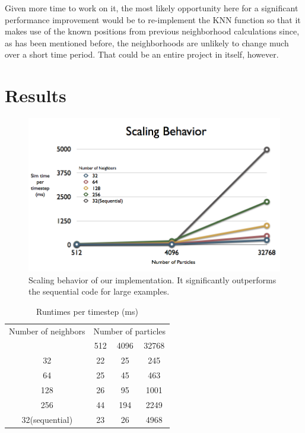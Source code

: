 \documentclass[cameraready]{acmsiggraph-awb}
\begin{document}
Given more time to work on it, the most likely opportunity here for a significant performance improvement would be to re-implement the KNN function so that it makes use of the known positions from previous neighborhood calculations since, as has been mentioned before, the neighborhoods are unlikely to change much over a short time period.
That could be an entire project in itself, however.

\section{Results}



\begin{figure}
\begin{centering}
\includegraphics[width = 5in]{Figures/charts_001.png}
\caption{Scaling behavior of our implementation.  It significantly outperforms the sequential code for large examples.}
\label{fig:scaling1}
\end{centering}
\end{figure}

\begin{table}[htdp]
\caption{Runtimes per timestep (ms)}
\begin{center}
\begin{tabular}{c|ccc}
Number of neighbors& \multicolumn{3}{c}{Number of particles} \\
&512&   4096&   32768 \\ \hline

32& 22&	25&	245 \\
64& 25&	45&	463 \\
128& 26	&95	&1001 \\
256& 44	&194&	2249 \\
32(sequential)& 23	&26	&4968  \\
\end{tabular}
\end{center}
\label{default}
\end{table}%
\end{document}
